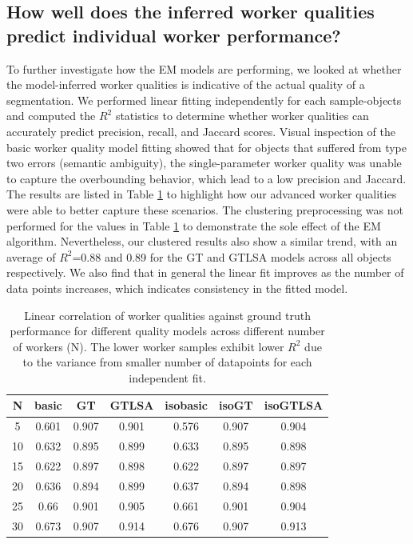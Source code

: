 \subsection*{How well does the inferred worker qualities predict individual worker performance?}
     To further investigate how the EM models are performing, we looked at whether the model-inferred worker qualities is indicative of the actual quality of a segmentation. We performed linear fitting independently for each sample-objects and computed the $R^2$ statistics to determine whether worker qualities can accurately predict precision, recall, and Jaccard scores. Visual inspection of the basic worker quality model fitting showed that for objects that suffered from type two errors (semantic ambiguity), the single-parameter worker quality was unable to capture the overbounding behavior, which lead to a low precision and Jaccard. The results are listed in Table \ref{correlation} to highlight how our advanced worker qualities were able to better capture these scenarios. The clustering preprocessing was not performed for the values in Table \ref{correlation} to demonstrate the sole effect of the EM algorithm. Nevertheless, our clustered results also show a similar trend, with an average of $R^2$=0.88 and 0.89 for the GT and GTLSA models across all objects respectively. We also find that in general the linear fit improves as the number of data points increases, which indicates consistency in the fitted model.
    \begin{table}[ht!]
      \small
      \begin{tabular}{ccccccc}
        \hline
           N &   basic &   GT &   GTLSA &   isobasic &   isoGT &   isoGTLSA \\
        \hline
              5 &      0.601 &   0.907 &      0.901 &       0.576 &    0.907 &       0.904 \\
            10 &      0.632 &   0.895 &      0.899 &       0.633 &    0.895 &       0.898 \\
            15 &      0.622 &   0.897 &      0.898 &       0.622 &    0.897 &       0.897 \\
            20 &      0.636 &   0.894 &      0.899 &       0.637 &    0.894 &       0.898 \\
            25 &      0.66  &   0.901 &      0.905 &       0.661 &    0.901 &       0.904 \\
            30 &      0.673 &   0.907 &      \cellcolor{blue!25}0.914 &       0.676 &    0.907 &       \cellcolor{blue!25}0.913 \\
        \hline
      \end{tabular}
        \caption{Linear correlation of worker qualities against ground truth performance for different quality models across different number of workers (N). The lower worker samples exhibit lower $R^2$ due to the variance from smaller number of datapoints for each independent fit. }
        \label{correlation}
    \end{table}
